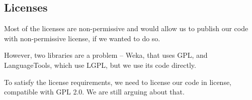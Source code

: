 \subsection*{Licenses}
Most of the licenses are non-permissive and would allow us to publish our code with non-permissive license, if we wanted to do so.

However, two libraries are a problem -- Weka, that uses GPL, and LanguageTools, which use LGPL, but we use its code directly.

To satisfy the license requirements, we need to license our code in license, compatible with GPL 2.0. We are still arguing about that.